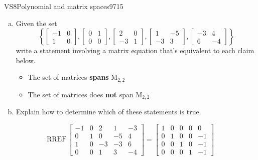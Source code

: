 \begin{exercise}{VS8}{Polynomial and matrix spaces}{9715} 
\begin{exerciseStatement} 

\begin{enumerate}[(a)]
\item  

 Given the set \[\left\{ \left[\begin{array}{cc}
-1 & 0 \\
1 & 0
\end{array}\right] , \left[\begin{array}{cc}
0 & 1 \\
0 & 0
\end{array}\right] , \left[\begin{array}{cc}
2 & 0 \\
-3 & 1
\end{array}\right] , \left[\begin{array}{cc}
1 & -5 \\
-3 & 3
\end{array}\right] , \left[\begin{array}{cc}
-3 & 4 \\
6 & -4
\end{array}\right] \right\}\] write a statement involving a matrix equation that's equivalent to each claim below. 

 

\begin{itemize}
\item  

 The set of matrices \textbf{spans} \(\mathrm{M}_{2,2}\) 

 
\item  

 The set of matrices does \textbf{not} span \(\mathrm{M}_{2,2}\) 

 
\end{itemize}

     
\item  

 Explain how to determine which of these statements is true. 

 
\end{enumerate}

     \end{exerciseStatement}
 \begin{exerciseAnswer} 

 \[
\mathrm{RREF}\, \left[\begin{array}{ccccc}
-1 & 0 & 2 & 1 & -3 \\
0 & 1 & 0 & -5 & 4 \\
1 & 0 & -3 & -3 & 6 \\
0 & 0 & 1 & 3 & -4
\end{array}\right] = \left[\begin{array}{ccccc}
1 & 0 & 0 & 0 & 0 \\
0 & 1 & 0 & 0 & -1 \\
0 & 0 & 1 & 0 & -1 \\
0 & 0 & 0 & 1 & -1
\end{array}\right]
            \] 


\end{exerciseAnswer}
\end{exercise}
